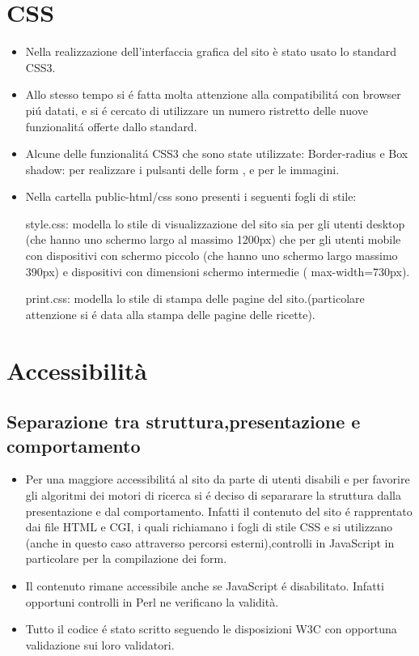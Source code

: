 \documentclass[12pt]{article}
\begin{document}
\section{CSS}
			\begin{itemize}
				\item Nella realizzazione dell'interfaccia grafica del sito è stato usato lo standard CSS3.
				\item Allo stesso tempo si \'e fatta molta attenzione alla compatibilit\'a con browser pi\'u datati, e si \'e cercato di utilizzare un numero ristretto delle nuove funzionalit\'a offerte dallo standard.
				
				\item Alcune delle funzionalit\'a CSS3 che sono state utilizzate:
				Border-radius e Box shadow: per realizzare i pulsanti delle form , e per le immagini.
				
			
				\item Nella cartella public-html/css sono presenti i seguenti fogli di stile:

				\subitem style.css: modella lo stile di visualizzazione del sito sia per gli utenti desktop (che hanno uno schermo largo al massimo 1200px) che per gli utenti mobile con dispositivi con schermo piccolo (che hanno uno schermo largo massimo 390px) e dispositivi con dimensioni schermo intermedie ( max-width=730px).


				\subitem print.css: modella lo stile di stampa delle pagine del sito.(particolare attenzione si \'e data alla stampa delle pagine delle ricette).
				\end{itemize}
	
		\section{Accessibilit\`a}
		\subsection{Separazione tra struttura,presentazione e comportamento}
		\begin{itemize}
			\item Per una maggiore accessibilit\'a al sito da parte di utenti disabili e per favorire gli algoritmi dei motori di ricerca si \'e deciso di separarare la struttura dalla presentazione e dal comportamento.
			Infatti il contenuto del sito \'e rapprentato dai file HTML e CGI, i quali richiamano i fogli di stile CSS e si utilizzano (anche in questo caso attraverso percorsi esterni),controlli in JavaScript in particolare per la compilazione dei form. 

			\item Il contenuto rimane accessibile anche se JavaScript \'e disabilitato. Infatti opportuni controlli in Perl ne verificano la validit\`a.

			\item Tutto il codice \'e stato scritto seguendo le disposizioni W3C con opportuna validazione sui loro validatori.
		\end{itemize}
\end{document}
